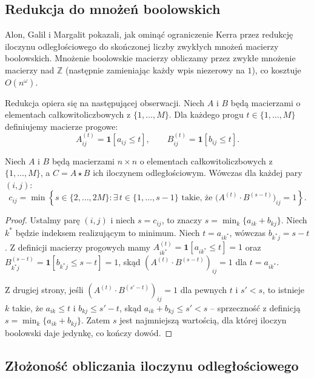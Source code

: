 \subsection{Redukcja do mnożeń boolowskich}

Alon, Galil i Margalit \cite{Alon} pokazali, jak ominąć ograniczenie
Kerra przez redukcję iloczynu odległościowego do skończonej liczby
zwykłych mnożeń macierzy boolowskich. Mnożenie boolowskie macierzy obliczamy przez zwykłe mnożenie macierzy nad $\mathbb{Z}$
(następnie zamieniając każdy wpis niezerowy na $1$), co kosztuje $O(n^\omega)$.

Redukcja opiera się na następującej obserwacji. Niech $A$ i $B$ będą
macierzami o elementach całkowitoliczbowych z $\{1, \ldots, M\}$.
Dla każdego progu $t \in \{1, \ldots, M\}$ definiujemy macierze
progowe:
\[
A^{(t)}_{ij} = \mathbf{1}[a_{ij} \leq t], \qquad
B^{(t)}_{ij} = \mathbf{1}[b_{ij} \leq t].
\]

\begin{lemat}
\label{lem:redukcja}
Niech $A$ i $B$ będą macierzami $n \times n$ o elementach
całkowitoliczbowych z $\{1, \ldots, M\}$, a $C = A \star B$
ich iloczynem odległościowym. Wówczas dla każdej pary $(i,j)$:
\[
c_{ij} = \min\!\left\{s \in \{2, \ldots, 2M\} :
\exists\, t \in \{1,\ldots,s-1\} \text{ takie, że }
\bigl(A^{(t)} \cdot B^{(s-t)}\bigr)_{ij} = 1\right\}.
\]
\end{lemat}

\begin{proof}
Ustalmy parę $(i,j)$ i niech $s = c_{ij}$, to znaczy
$s = \min_k\{a_{ik} + b_{kj}\}$. Niech $k^*$ będzie indeksem
realizującym to minimum. Niech $t = a_{ik^*}$, wówczas
$b_{k^* j} = s - t$. Z definicji macierzy progowych mamy
$A^{(t)}_{ik^*} = \mathbf{1}[a_{ik^*} \leq t] = 1$ oraz
$B^{(s-t)}_{k^*j} = \mathbf{1}[b_{k^*j} \leq s-t] = 1$,
skąd $(A^{(t)} \cdot B^{(s-t)})_{ij} = 1$ dla $t = a_{ik^*}$.

Z drugiej strony, jeśli $(A^{(t)} \cdot B^{(s'-t)})_{ij} = 1$
dla pewnych $t$ i $s' < s$, to istnieje $k$ takie, że $a_{ik} \leq t$
i $b_{kj} \leq s' - t$, skąd $a_{ik} + b_{kj} \leq s' < s$
-- sprzeczność z definicją $s = \min_k\{a_{ik}+b_{kj}\}$.
Zatem $s$ jest najmniejszą wartością, dla której iloczyn boolowski
daje jedynkę, co kończy dowód.
\end{proof}

\subsection{Złożoność obliczania iloczynu odległościowego}

